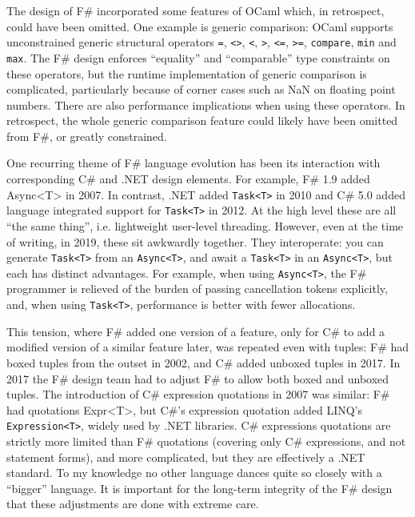\documentclass[acmsmall]{acmart}\settopmatter{}
\begin{document}
The design of F\# incorporated some features of OCaml which, in retrospect, could have
been omitted.  One example is generic comparison: OCaml supports unconstrained generic
structural operators \texttt{=}, \texttt{<>}, \texttt{<}, \texttt{>}, \texttt{<=}, \texttt{>=}, \texttt{compare}, \texttt{min} and \texttt{max}.
The F\# design enforces “equality” and “comparable” type constraints on these operators, but the runtime
implementation of generic comparison is complicated, particularly because of corner cases
such as NaN on floating point numbers. There are also performance implications when
using these operators. In retrospect, the whole generic comparison feature could likely
have been omitted from F\#, or greatly constrained.

One recurring theme of F\# language evolution has been its interaction with corresponding
C\# and .NET design elements.  For example, F\# 1.9 added Async<T> in 2007.  In
contrast, .NET added \texttt{Task<T>} in 2010 and C\# 5.0 added language integrated support for \texttt{Task<T>} in
2012.  At the high level these are all “the same thing”, i.e. lightweight user-level threading. However,
even at the time of writing, in 2019, these sit awkwardly together. They interoperate:
you can generate \texttt{Task<T>} from an \texttt{Async<T>}, and await a \texttt{Task<T>} in an \texttt{Async<T>}, but
each has distinct advantages. For example, when using \texttt{Async<T>}, the F\# programmer is relieved of the burden of
passing cancellation tokens explicitly, and, when using \texttt{Task<T>}, performance is better with fewer allocations.  

This tension, where F\# added one version of a feature, only for C\# to add a modified version of a similar
feature later, was repeated even with tuples: F\# had boxed tuples from the outset in 2002,
and C\# added unboxed tuples in 2017.  In 2017 the F\# design team had to
adjust F\# to allow both boxed and unboxed tuples. The introduction of C\# expression quotations in
2007 was similar: F\# had quotations Expr<T>, but C\#’s expression quotation added
LINQ’s \texttt{Expression<T>}, widely used by .NET libraries. C\# expressions quotations are strictly
more limited than F\# quotations (covering only C\# expressions, and not statement forms), and
more complicated, but they are effectively a .NET standard.  To my knowledge no other language
dances quite so closely with a “bigger” language. It is important for the long-term integrity of the F\# design
that these adjustments are done with extreme care.
\end{document}
